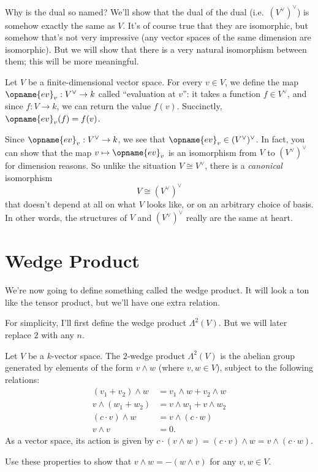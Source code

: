 \begin{itemize}
	\ii Why is the dual so named?
	We'll show that the dual of the dual (i.e.\ $(V^\vee)^\vee$)
	is somehow exactly the same as $V$.
	It's of course true that they are isomorphic, but somehow that's
	not very impressive (any vector spaces of the same dimension are isomorphic).
	But we will show that there is a very natural isomorphism between them;
	this will be more meaningful.

	Let $V$ be a finite-dimensional vector space.
	For every $v \in V$, we define the map $\opname{ev}_v : V^\vee \to k$
	called ``evaluation at $v$'': it takes a function $f \in V^\vee$,
	and since $f : V \to k$, we can return the value $f(v)$.
	Succinctly, $\opname{ev}_v(f) = f(v)$.

	Since $\opname{ev}_v : V^\vee \to k$, we see that
	$\opname{ev}_v \in (V^\vee)^\vee$.
	In fact, you can show that the map $v \mapsto \opname{ev}_v$
	is an isomorphism from $V$ to $(V^\vee)^\vee$ for dimension reasons.
	So unlike the situation $V \cong V^\vee$, there
	is a \emph{canonical} isomorphism \[ V \cong (V^\vee)^\vee \]
	that doesn't depend at all on what $V$ looks like,
	or on an arbitrary choice of basis.
	In other words, the structures of $V$ and $(V^\vee)^\vee$
	really are the same at heart.
\end{itemize}



\section{Wedge Product}
We're now going to define something called the wedge product.
It will look a ton like the tensor product, but we'll have one extra relation.

For simplicity, I'll first define the wedge product $\Lambda^2(V)$.
But we will later replace $2$ with any $n$.

\begin{definition}
	Let $V$ be a $k$-vector space.
	The $2$-wedge product $\Lambda^2(V)$ is the abelian group
	generated by elements of the form $v \wedge w$ (where $v,w \in V$),
	subject to the following relations:
	\begin{align*}
		(v_1 + v_2) \wedge w &= v_1 \wedge w + v_2 \wedge w \\
		v \wedge (w_1 + w_2) &= v \wedge w_1 + v \wedge w_2 \\
		(c \cdot v) \wedge w &= v \wedge (c \cdot w) \\
		v \wedge v &= 0.
	\end{align*}
	As a vector space, its action is given by
	$c \cdot (v \wedge w) = (c \cdot v) \wedge w = v \wedge (c \cdot w)$.
\end{definition}
\begin{exercise}
	Use these properties to show that $v \wedge w = - (w \wedge v)$
	for any $v,w \in V$.
\end{exercise}

